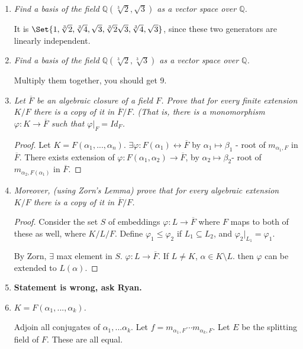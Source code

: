 \documentclass[9pt,reqno,twoside]{amsbook}
\theoremstyle{plain}
\numberwithin{section}{chapter}
\numberwithin{equation}{chapter}
\theoremstyle{definition}
\theoremstyle{remark}
\theoremstyle{plain}
\newcommand{\sub}{\subseteq}
\newcommand{\Q}{\mathbb{Q}}
\newcommand{\counter}{\setcounter}
\renewcommand{\leq}{\leqslant}
\renewcommand{\bar}{\overline}%
\renewcommand{\phi}{\varphi}
\begin{document}
\begin{enumerate}[label=\arabic*.]
\item \textit{Find a basis of the field $\Q(\sqrt[3]{2},\sqrt{3})$ as a vector space over $\Q$. }

It is $\Set{1, \sqrt[3]{2}, \sqrt[3]{4}, \sqrt{3}, \sqrt[3]{2}\sqrt{3}, \sqrt[3]{4}, \sqrt{3}}$, since these two generators are linearly independent. 

\item \textit{Find a basis of the field $\Q(\sqrt[3]{2},\sqrt[3]{3})$ as a vector space over $\Q$. }

Multiply them together, you should get 9. 




\counter{enumi}{12}

\item \textit{Let $\bar{F}$ be an algebraic closure of a field $F$. Prove that for every finite extension $K/F$ there is a copy of it in $\bar{F}/F$. (That is, there is a monomorphism $\phi:K \to \bar{F}$ such that $\phi|_F = Id_F$. }

\begin{proof}
Let $K = F(\alpha_1,...,\alpha_n)$. $\exists \phi: F(\alpha_1) \leftrightarrow \bar{F}$ by $\alpha_1 \mapsto \beta_1$ - root of $m_{\alpha_1,F}$ in $\bar{F}$. There exists extension of $\phi:F(\alpha_1,\alpha_2) \to \bar{F}$, by $\alpha_2 \mapsto \beta_2$- root of $m_{\alpha_2,F(\alpha_1)}$ in $\bar{F}$. 
\end{proof}

\item \textit{Moreover, (using Zorn's Lemma) prove that for every algebraic extension $K/F$ there is a copy of it in $\bar{F}/F$. }


\begin{proof}
Consider the set $S$ of embeddings $\phi:L \to \bar{F}$ where $F$ maps to both of these as well, where $K/L/F$. Define $\phi_1 \leq \phi_2$ if $L_1 \sub L_2$, and $\phi_2|_{L_1} = \phi_1$. 

By Zorn, $\exists$ max element in $S$. $\phi:L \to \bar{F}$. If $L \neq K$, $\alpha \in K \setminus L$. then $\phi$ can be extended to $L(\alpha)$. 
\end{proof}

\counter{enumi}{15}

\item \textbf{Statement is wrong, ask Ryan. }

\item \textit{$K = F(\alpha_1,...,\alpha_k)$. }

Adjoin all conjugates of $\alpha_1,...\alpha_k$. Let $f = m_{\alpha_1,F}\cdots m_{\alpha_k,F}$. Let $E$ be the splitting field of $F$. These are all equal. 



\end{enumerate}
\end{document}
